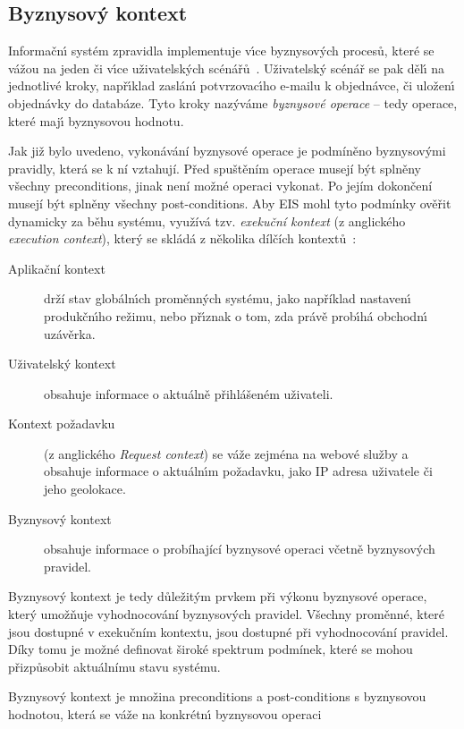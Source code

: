\subsection{Byznysov\'y kontext}

Informačn\'{\i} systém zpravidla implementuje v\'{\i}ce byznysov\'ych procesů, které se vážou
na jeden či v\'{\i}ce uživatelsk\'ych scénářů~\cite{larman2001patterns}. Uživatelsk\'y scénář se
pak děl\'{\i} na jednotlivé kroky, např\'{\i}klad zaslán\'{\i} potvrzovac\'{\i}ho e-mailu k objednávce, či uložen\'{\i} objednávky
do databáze. Tyto kroky naz\'yváme \textit{byznysové operace} -- tedy operace, které maj\'{\i}
byznysovou hodnotu.

Jak již bylo uvedeno, vykonávání byznysové operace je podmíněno byznysovými pravidly, která se k ní vztahují. Před spuštěním operace musejí
být splněny všechny preconditions, jinak není možné operaci vykonat. Po jejím dokončení musejí být splněny všechny post-conditions.
Aby \gls{EIS} mohl tyto podmínky ověřit dynamicky za běhu systému, využívá tzv. \textit{exekuční kontext} (z anglického
\textit{execution context}), který se skládá z několika dílčích kontextů~\cite{cemus2017separation}:

\begin{description}
    \item[Aplikační kontext] drží stav globáln\'{\i}ch proměnn\'ych systému, jako například nastaven\'{\i}
    produkčn\'{\i}ho režimu, nebo př\'{\i}znak o tom, zda právě prob\'{\i}há obchodn\'{\i} uzávěrka.
    \item[Uživatelský kontext] obsahuje informace o aktuálně přihlášeném uživateli.
    \item[Kontext požadavku] (z anglického \textit{Request context}) se váže zejména na webové služby a obsahuje
    informace o aktuáln\'{\i}m požadavku, jako IP adresa uživatele či jeho geolokace.
    \item[Byznysov\'y kontext] obsahuje informace o probíhající byznysové operaci včetně byznysových pravidel.
\end{description}

Byznysový kontext je tedy důležitým prvkem při výkonu byznysové operace, který umožňuje vyhodnocování byznysových pravidel.
Všechny proměnné, které jsou dostupné v exekučním kontextu, jsou dostupné při vyhodnocování pravidel. Díky tomu je možné
definovat široké spektrum podmínek, které se mohou přizpůsobit aktuálnímu stavu systému.

\begin{definition}
    Byznysový kontext je množina preconditions a post-conditions s byznysovou hodnotou, která se váže na
    konkrétn\'{\i} byznysovou operaci~\cite{cemus2015automated}
\end{definition}

